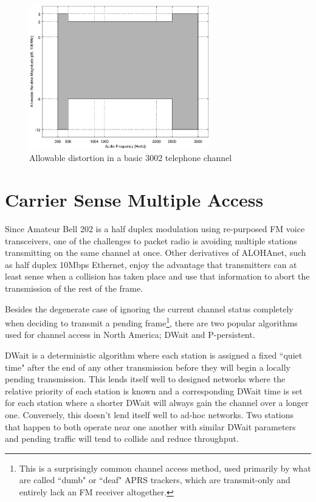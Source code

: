 \documentclass[12pt,letterpaper]{article}
\begin{document}
\begin{figure}
	\centering
	\includegraphics[width=0.7\textwidth]{src/octave/3002}
	\caption{Allowable distortion in a basic 3002 telephone channel}
	\label{fig:3002}
\end{figure}


\section{Carrier Sense Multiple Access}
\label{sec:bell202csma}

Since Amateur Bell 202 is a half duplex modulation using re-purposed 
FM voice transceivers, 
one of the challenges to packet radio is avoiding multiple stations
transmitting on the same channel at once. 
Other derivatives of ALOHAnet, 
such as half duplex 10Mbps Ethernet, 
enjoy the advantage that transmitters can
at least sense when a collision has taken place 
and use that information to abort the transmission of the rest of the frame.

Besides the degenerate case of ignoring the current channel status completely when 
deciding to transmit a pending frame\footnote{This is a surprisingly
	common channel access method, used primarily by what are called ``dumb" or
	``deaf" APRS trackers, which are transmit-only and entirely lack an
FM receiver altogether.}, there are two popular algorithms used for
channel access in North America;
DWait and P-persistent.

DWait is a deterministic algorithm where each station is assigned a fixed
``quiet time" after the end of any other transmission 
before they will begin a locally pending transmission. 
This lends itself well to designed networks
where the relative priority of each station is known and a corresponding DWait time
is set for each station where a shorter DWait will 
always gain the channel over a longer one. 
Conversely, this doesn't lend itself well to ad-hoc networks.
Two stations that happen to both operate near one another 
with similar DWait parameters
and pending traffic will tend to collide and reduce throughput.
\end{document}
